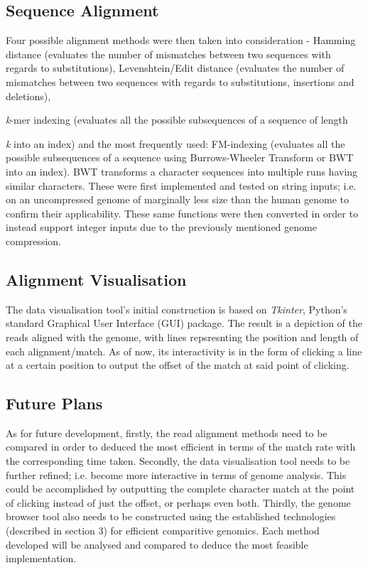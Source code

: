 \documentclass{csfyp}
\begin{document}
\subsection{Sequence Alignment}\vspace{-2ex}
Four possible alignment methods were then taken into consideration - Hamming distance (evaluates the number of mismatches between two sequences with regards to substitutions), Levenshtein/Edit distance (evaluates the number of mismatches between two sequences with regards to substitutions, insertions and deletions),  {\textit{k}-mer indexing (evaluates all the possible subsequences of a sequence of length {\textit{k} into an index) and the most frequently used: FM-indexing (evaluates all the possible subsequences of a sequence using Burrows-Wheeler Transform or BWT into an index).  BWT transforms a character sequences into multiple runs having similar characters.  These were first implemented and tested on string inputs; i.e. on an uncompressed genome of marginally less size than the human genome to confirm their applicability.  These same functions were then converted in order to instead support integer inputs due to the previously mentioned genome compression.    

\subsection{Alignment Visualisation}\vspace{-2ex}
The data visualisation tool's initial construction is based on {\textit{Tkinter}}, Python's standard Graphical User Interface (GUI) package.  The result is a depiction of the reads aligned with the genome, with lines repsresnting the position and length of each alignment/match.  As of now, its interactivity is in the form of clicking a line at a certain position to output the offset of the match at said point of clicking.     

\subsection{Future Plans}\vspace{-2ex}
As for future development, firstly, the read alignment methods need to be compared in order to deduced the most efficient in terms of the match rate with the corresponding time taken.  
Secondly, the data visualisation tool needs to be further refined; i.e. become more interactive in terms of genome analysis.  This could be accomplished by outputting the complete character match at the point of clicking instead of just the offset, or perhaps even both.       
Thirdly, the genome browser tool also needs to be constructed using the established technologies (described in section 3) for efficient comparitive genomics.  Each method developed will be analysed and compared to deduce the most feasible implementation.   


}}
\end{document}
